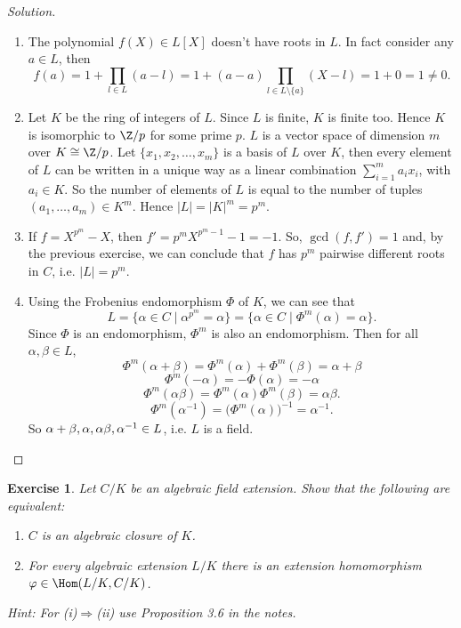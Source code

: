 \documentclass[a4paper,10pt,reqno]{amsart}
\newtheorem{ex}{Exercise}[section]
\newenvironment{sol}
  {\renewcommand\qedsymbol{$\blacksquare$}\begin{proof}[Solution]}
  {\end{proof}}
\begin{document}
\begin{sol}~
\begin{enumerate}[label=(\roman*)]
    \item The polynomial $f(X)\in L[X]$ doesn't have roots in $L$.
    In fact consider any $a\in L$, then 
    \[
    f(a)=1+\prod_{l\in L} (a-l)=1+(a-a)\prod_{l\in L\setminus \{a\}} (X-l)=1+0=1\neq 0.
    \]
    \item Let $K$ be the ring of integers of $L$. 
    Since $L$ is finite, $K$ is finite too. 
    Hence $K$ is isomorphic to $\Z/p$ for some prime $p$.
    $L$ is a vector space of dimension $m$ over $K\cong\Z/p$.
    Let $\{x_1,x_2,\dots,x_m\}$ is a 
    basis of $L$ over $K$,
    then every element of $L$ can be 
    written in a unique way as a linear 
    combination $\sum_{i=1}^m a_ix_i$, 
    with $a_i\in K$.
    So the number of elements of $L$ is
    equal to the number of tuples
    $(a_1,\dots,a_m)\in K^m$.
    Hence $|L|=|K|^m=p^m$.
    \item If $f=X^{p^m}-X$, then $f'=p^mX^{p^m-1}-1=-1$. 
    So, $ \gcd(f,f')=1$ and, by the previous exercise, we can conclude 
    that $f$ has $p^m$ pairwise different roots in $C$, i.e. $|L|=p^m$.
    \item Using the Frobenius endomorphism $\Phi $ of $K$, we can see that
    \[
    L=\{\alpha\in C\mid \alpha^{p^m}=\alpha\}=\{\alpha\in C\mid \Phi^m(\alpha)=\alpha\}.
    \]
    Since $\Phi$ is an endomorphism, $\Phi^m$ is also an endomorphism.
    Then for all $\alpha,\beta\in L$,
    \[
    \Phi^m(\alpha+\beta)=\Phi^m(\alpha)+\Phi^m(\beta)=\alpha+\beta
    \]
    \[
    \Phi^m(-\alpha)=-\Phi(\alpha)=-\alpha
    \]
    \[
    \Phi^m(\alpha\beta)=\Phi^m(\alpha)\Phi^m(\beta)=\alpha\beta.
    \]
    \[
    \Phi^m(\alpha^{-1})=\big(\Phi^m(\alpha)\big)^{-1}=\alpha^{-1}.
    \]
    So $\alpha+\beta,\-\alpha,\alpha\beta,\alpha^{-1}\in L$, i.e.
    $L$ is a field.\qedhere
\end{enumerate}
\end{sol}

\begin{ex}
\label{4.3}
Let $C/K$ be an algebraic field extension.
Show that the following are equivalent:
\begin{enumerate}[label=(\roman*)]
    \item $C$ is an algebraic closure of $K$.
    \item For every algebraic extension $L/K$ there is an extension homomorphism $\varphi\in \Hom(L/K,C/K)$.
\end{enumerate}  
\noindent \textit{Hint:} For (i)$\Rightarrow$(ii) use Proposition 3.6 in the notes.
\end{ex}
\end{document}
